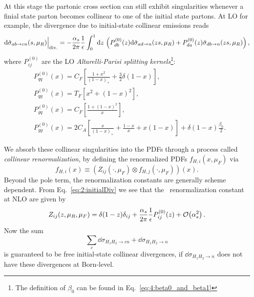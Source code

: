 At this stage the partonic cross section can still exhibit singularities whenever a finial state parton becomes collinear to one of the initial state partons. At \acs{LO} for example, the divergence due to initial-state collinear emissions reads
\begin{equation}
\mathrm{d} \hat{\sigma}_{a b \rightarrow c n}(s, \mu_R) \Big\vert_{\text{div.}} = - \frac{\alpha_s}{2 \pi} \frac{1}{\epsilon}  \int_0^1 \mathrm{d} z\, \left(P_{db}^{(0)}(z) \mathrm{d} \hat{\sigma}_{a d \rightarrow n}(z s, \mu_R) + P_{da}^{(0)}(z) \hat{\sigma}_{d b \rightarrow n}(zs, \mu_R) \right),
\label{eq:2:initialDiv}
\end{equation}
where $P_{ij}^{(0)}$ are the \acs{LO} \textit{Altarelli-Parisi splitting kernels}\footnote{The definition of $\beta_0$ can be found in Eq.~\eqref{eq:4:beta0_and_beta1}}:
\begin{equation}
\begin{split}
&P_{qq}^{(0)}(x) = C_F \left[ \frac{1 + x^2}{(1 - x)_+} + \frac{3}{2} \delta (1 - x) \right], \\[3mm]
&P_{qg}^{(0)}(x) = T_F \left[ x^2 + (1 - x)^2 \right], \\[3mm]
&P_{gq}^{(0)}(x) = C_F \left[ \frac{1 + (1 - x)^2}{x} \right], \\[2mm]
&P_{gg}^{(0)}(x) = 2C_A \left[ \frac{x}{(1 - x)_+} + \frac{1 - x}{x} + x (1 - x) \right] + \delta(1 - x) \frac{\beta_0}{2}.
\end{split}
\label{eq:2:Altarelli_Parisi_splitting_functions}
\end{equation}

We absorb these collinear singularities into the PDFs through a process called \textit{collinear renormalization}, by defining the renormalized \acs{PDF}s $f_{H, i}(x, \mu_F)$ via
\begin{equation}
f_{H, i}(x) \equiv (Z_{ij}(\cdot, \mu_F) \otimes f_{H, j}(\cdot, \mu_F))(x).
\end{equation}
Beyond the pole term, the renormalization constants are generally scheme dependent. From Eq.~\eqref{eq:2:initialDiv} we see that the \MS\ renormalization constant at NLO are given by
\begin{equation}
Z_{ij}(z, \mu_R, \mu_F) = \delta(1 - z) \delta_{ij} + \frac{\alpha_s}{2 \pi} \frac{1}{\epsilon} P_{ij}^{(0)}(z) + \mathcal{O}\!\left(\alpha_s^2\right).
\end{equation}
Now the sum
\begin{equation}
\sum_c \dd \sigma_{H_1 H_2 \rightarrow c n} + \dd \sigma_{H_1 H_2 \rightarrow n}
\end{equation}
is guaranteed to be free initial-state collinear divergences, if $\dd \sigma_{H_1 H_2 \rightarrow n}$ does not have these divergences at Born-level.

